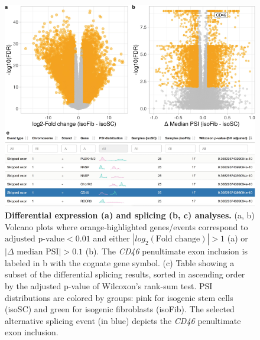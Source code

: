 \begin{figure}
  \includegraphics[width=\linewidth]{images/psichomics/6-diff-analyses}
  \caption[Differential expression and splicing analyses]{\textbf{Differential expression (a) and splicing (b, c) analyses.} (a, b) Volcano plots where orange-highlighted genes/events correspond to $\textrm{adjusted p-value} < 0.01$ and either $|log_2(\textrm{Fold change})| > 1$ (a) or $|\Delta \textrm{ median PSI}| > 0.1$ (b). The \emph{CD46} penultimate exon inclusion is labeled in b with the cognate gene symbol. (c) Table showing a subset of the differential splicing results, sorted in ascending order by the adjusted p-value of Wilcoxon’s rank-sum test. PSI distributions are colored by groups: pink for isogenic stem cells (isoSC) and green for isogenic fibroblasts (isoFib). The selected alternative splicing event (in blue) depicts the \emph{CD46} penultimate exon inclusion.}
  \label{fig:psichomics-diff-analyses}
\end{figure}


